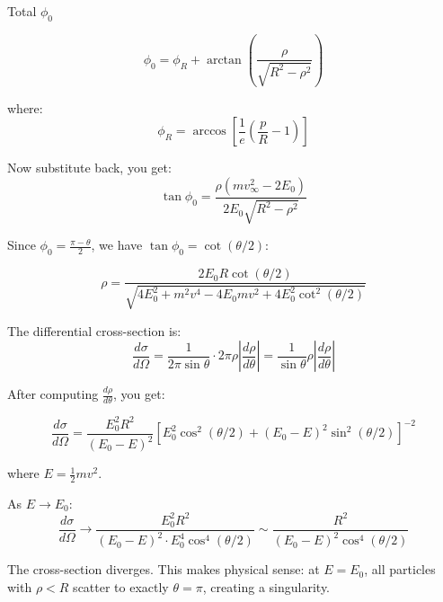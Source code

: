 \documentclass[]{article}
\numberwithin{equation}{section}
\newcommand{\0}{\textcolor{gray}{0}}
\begin{document}
	Total $\phi_0$
	
	$$\phi_0 = \phi_R + \arctan\left(\frac{\rho}{\sqrt{R^2 - \rho^2}}\right)$$
	
	where:
	$$\phi_R = \arccos\left[\frac{1}{e}\left(\frac{p}{R} - 1\right)\right]$$
	
	Now substitute back, you get:
	$$\tan\phi_0 = \frac{\rho(mv^2_\infty - 2E_0)}{2E_0\sqrt{R^2 - \rho^2}}$$
	
	Since $\phi_0 = \frac{\pi - \theta}{2}$, we have $\tan\phi_0 = \cot(\theta/2)$:
	
	$$\rho = \frac{2E_0 R \cot(\theta/2)}{\sqrt{4E_0^2 + m^2v^4 - 4E_0 mv^2 + 4E_0^2\cot^2(\theta/2)}}$$
	
	The differential cross-section is:
	$$\frac{d\sigma}{d\Omega} = \frac{1}{2\pi\sin\theta} \cdot 2\pi\rho \left|\frac{d\rho}{d\theta}\right| = \frac{1}{\sin\theta}\rho\left|\frac{d\rho}{d\theta}\right|$$
	
	After computing $\frac{d\rho}{d\theta}$, you get:
	
	$$\boxed{\frac{d\sigma}{d\Omega} = \frac{E_0^2 R^2}{(E_0 - E)^2}\left[E_0^2\cos^2(\theta/2) + (E_0 - E)^2\sin^2(\theta/2)\right]^{-2}}$$
	
	where $E = \frac{1}{2}mv^2$.
	
	
	As $E \to E_0$:
	$$\frac{d\sigma}{d\Omega} \to \frac{E_0^2 R^2}{(E_0 - E)^2 \cdot E_0^4\cos^4(\theta/2)} \sim \frac{R^2}{(E_0 - E)^2\cos^4(\theta/2)}$$
	
	The cross-section diverges. This makes physical sense: at $E = E_0$, all particles with $\rho < R$ scatter to exactly \(\theta = \pi\), creating a singularity.
\end{document}
